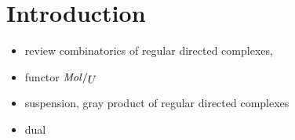 \section*{Introduction}

\begin{itemize}
    \item review combinatorics of regular directed complexes, 
    \item functor \( \molecin{U} \)
    \item suspension, gray product of regular directed complexes
    \item dual
\end{itemize}
